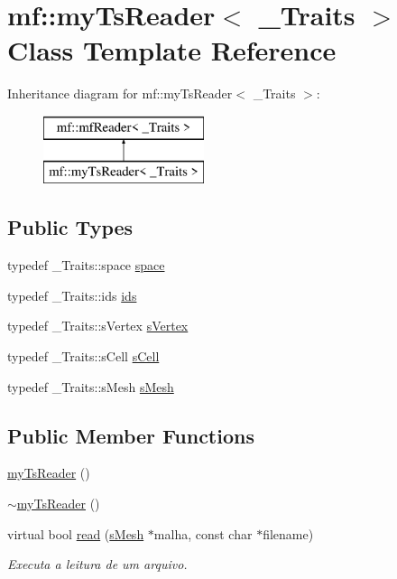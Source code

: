 \hypertarget{classmf_1_1myTsReader}{
\section{mf::myTsReader$<$ \_\-Traits $>$ Class Template Reference}
\label{classmf_1_1myTsReader}
}
Inheritance diagram for mf::myTsReader$<$ \_\-Traits $>$:\begin{figure}[H]
\begin{center}
\leavevmode
\includegraphics[height=2.000000cm]{classmf_1_1myTsReader}
\end{center}
\end{figure}
\subsection*{Public Types}
\begin{DoxyCompactItemize}
\item 
typedef \_\-Traits::space \hyperlink{classmf_1_1myTsReader_a093186d16379743990dcec3f7eb78f20}{space}
\item 
typedef \_\-Traits::ids \hyperlink{classmf_1_1myTsReader_ad3ffe55514e0229db84f085cc1d88c99}{ids}
\item 
typedef \_\-Traits::sVertex \hyperlink{classmf_1_1myTsReader_a4844880ee2a7a3656545dce76bbcaaba}{sVertex}
\item 
typedef \_\-Traits::sCell \hyperlink{classmf_1_1myTsReader_a38e884b502c798830b1598e6f56f97bc}{sCell}
\item 
typedef \_\-Traits::sMesh \hyperlink{classmf_1_1myTsReader_a2b17f65a22359c58f4cbf59b289a3284}{sMesh}
\end{DoxyCompactItemize}
\subsection*{Public Member Functions}
\begin{DoxyCompactItemize}
\item 
\hyperlink{classmf_1_1myTsReader_ab0a76a68ceb12ee2e90f913147ab273e}{myTsReader} ()
\item 
\hyperlink{classmf_1_1myTsReader_a03df726db3f0ab6b7ff45e58772bbfaa}{$\sim$myTsReader} ()
\item 
virtual bool \hyperlink{classmf_1_1myTsReader_a84fa0feda9979c77cfb609f3310fd31e}{read} (\hyperlink{classmf_1_1myTsReader_a2b17f65a22359c58f4cbf59b289a3284}{sMesh} $\ast$malha, const char $\ast$filename)
\begin{DoxyCompactList}\small\item\em Executa a leitura de um arquivo. \item\end{DoxyCompactList}\end{DoxyCompactItemize}
